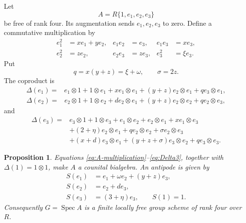 \documentclass[11pt]{article}
\newtheorem{proposition}[theorem]{Proposition}
\theoremstyle{remark}
\newcommand{\Spec}{\operatorname{Spec}}
\begin{document}
Let
\[
 A=R\{1,e_1,e_2,e_3\}
\]
be free of rank four.  Its augmentation sends \(e_1,e_2,e_3\) to zero.
Define a commutative multiplication by
\begin{equation}\label{eq:A-multiplication}
\begin{aligned}
 e_1^2&=xe_1+ye_2,& e_1e_2&=e_3,& e_1e_3&=xe_3,\\
 e_2^2&=ze_2,&e_2e_3&=ze_3,&e_3^2&=\xi e_3.
\end{aligned}
\end{equation}
Put
\begin{equation}\label{eq:q-sigma}
 q=x(y+z)=\xi+\omega,\qquad \sigma=2z.
\end{equation}
The coproduct is
\begin{equation}\label{eq:Delta1}
\begin{split}
\Delta(e_1)={}&e_1\otimes1+1\otimes e_1
 +x e_1\otimes e_1 +(y+z)e_2\otimes e_1+q e_3\otimes e_1,
\end{split}
\end{equation}
\begin{equation}\label{eq:Delta2}
\begin{split}
\Delta(e_2)={}&e_2\otimes1+1\otimes e_2
 +d e_2\otimes e_1 +(y+z)e_2\otimes e_2+q e_2\otimes e_3,
\end{split}
\end{equation}
and
\begin{equation}\label{eq:Delta3}
\begin{split}
\Delta(e_3)={}&e_3\otimes1+1\otimes e_3
 +e_1\otimes e_2+e_2\otimes e_1+x e_1\otimes e_3\\
& +(2+\eta)e_2\otimes e_1+q e_2\otimes e_2
  +\sigma e_2\otimes e_3\\
& +(x+d)e_3\otimes e_1+(y+z+\sigma)e_3\otimes e_2
  +q e_3\otimes e_3.
\end{split}
\end{equation}

\begin{proposition}\label{prop:hopf}
Equations \eqref{eq:A-multiplication}--\eqref{eq:Delta3}, together with
\(\Delta(1)=1\otimes1\), make \(A\) a counital bialgebra.  An antipode is
given by
\begin{equation}\label{eq:antipode}
\begin{aligned}
 S(e_1)&=e_1+\omega e_2+(y+z)e_3,\\
 S(e_2)&=e_2+d e_3,\\
 S(e_3)&=(3+\eta)e_3,\qquad S(1)=1.
\end{aligned}
\end{equation}
Consequently \(G=\Spec A\) is a finite locally free group scheme of rank
four over \(R\).
\end{proposition}
\end{document}
